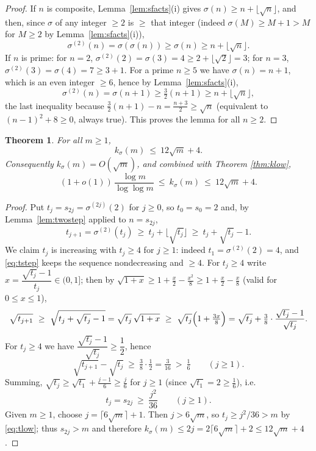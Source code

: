 \documentclass{amsart}
\newtheorem{theorem}{Theorem}
\theoremstyle{definition}
\begin{document}
\begin{proof}
If $n$ is composite, Lemma~\ref{lem:sfacts}(i) gives
$\sigma(n)\ge n+\lfloor\sqrt n\rfloor$, and then, since $\sigma$ of any integer
$\ge2$ is $\ge$ that integer (indeed $\sigma(M)\ge M+1>M$ for $M\ge2$ by
Lemma~\ref{lem:sfacts}(i)),
\[
\sigma^{(2)}(n)=\sigma(\sigma(n))\ge \sigma(n)\ge n+\lfloor\sqrt n\rfloor .
\]
If $n$ is prime: for $n=2$, $\sigma^{(2)}(2)=\sigma(3)=4\ge 2+\lfloor\sqrt2\rfloor=3$;
for $n=3$, $\sigma^{(2)}(3)=\sigma(4)=7\ge 3+1$. For a prime $n\ge5$ we have
$\sigma(n)=n+1$, which is an even integer $\ge6$, hence by
Lemma~\ref{lem:sfacts}(i),
\[
\sigma^{(2)}(n)=\sigma(n+1)\ge\tfrac32(n+1)\ge n+\lfloor\sqrt n\rfloor,
\]
the last inequality because $\tfrac32(n+1)-n=\tfrac{n+3}2\ge\sqrt n$ (equivalent
to $(n-1)^2+8\ge0$, always true). This proves the lemma for all $n\ge2$.
\end{proof}

\begin{theorem}\label{thm:kup}
For all $m\ge1$,
\[
k_\sigma(m)\ \le\ 12\sqrt{m}+4 .
\]
Consequently $k_\sigma(m)=O(\sqrt m)$, and combined with Theorem
\ref{thm:klow},
\[
(1+o(1))\,\frac{\log m}{\log\log m}\ \le\ k_\sigma(m)\ \le\ 12\sqrt m+4 .
\]
\end{theorem}

\begin{proof}
Put $t_j=s_{2j}=\sigma^{(2j)}(2)$ for $j\ge0$, so $t_0=s_0=2$ and, by
Lemma~\ref{lem:twostep} applied to $n=s_{2j}$,
\begin{equation}\label{eq:tstep}
t_{j+1}=\sigma^{(2)}(t_j)\ \ge\ t_j+\lfloor\sqrt{t_j}\rfloor\ \ge\ t_j+\sqrt{t_j}-1 .
\end{equation}
We claim $t_j$ is increasing with $t_j\ge4$ for $j\ge1$: indeed
$t_1=\sigma^{(2)}(2)=4$, and \eqref{eq:tstep} keeps the sequence
nondecreasing and $\ge4$. For $t_j\ge4$ write $x=\dfrac{\sqrt{t_j}-1}{t_j}\in(0,1]$;
then by $\sqrt{1+x}\ge 1+\tfrac{x}{2}-\tfrac{x^2}{8}\ge 1+\tfrac x2-\tfrac x8$
(valid for $0\le x\le1$),
\[
\sqrt{t_{j+1}}\ \ge\ \sqrt{t_j+\sqrt{t_j}-1}
=\sqrt{t_j}\,\sqrt{1+x}
\ \ge\ \sqrt{t_j}\Bigl(1+\tfrac{3x}{8}\Bigr)
=\sqrt{t_j}+\tfrac38\cdot\frac{\sqrt{t_j}-1}{\sqrt{t_j}} .
\]
For $t_j\ge4$ we have $\dfrac{\sqrt{t_j}-1}{\sqrt{t_j}}\ge\dfrac12$, hence
\[
\sqrt{t_{j+1}}-\sqrt{t_j}\ \ge\ \tfrac38\cdot\tfrac12=\tfrac{3}{16}\ >\ \tfrac16
\qquad(j\ge1).
\]
Summing, $\sqrt{t_j}\ge\sqrt{t_1}+\tfrac{j-1}{6}\ge\tfrac{j}{6}$ for $j\ge1$
(since $\sqrt{t_1}=2\ge\tfrac16$), i.e.
\begin{equation}\label{eq:tlow}
t_j=s_{2j}\ \ge\ \frac{j^2}{36}\qquad(j\ge1).
\end{equation}
Given $m\ge1$, choose $j=\lceil 6\sqrt{m}\rceil+1$. Then $j>6\sqrt m$, so
$t_j\ge j^2/36>m$ by \eqref{eq:tlow}; thus $s_{2j}>m$ and therefore
$k_\sigma(m)\le 2j=2\lceil6\sqrt m\rceil+2\le 12\sqrt m+4$.
\end{proof}
\end{document}

